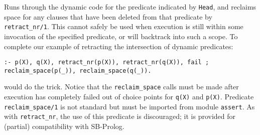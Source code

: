 \begin{description}
{%

 Runs
through the dynamic code for the predicate indicated by {\tt Head},
and reclaims space for any clauses that have been deleted from that
predicate by {\tt retract\_nr/1}.  This cannot safely be used when
execution is still within some invocation of the specified predicate,
or will backtrack into such a scope.  To complete our example of
retracting the intersection of dynamic predicates:
\begin{center}
{\tt :- p(X), q(X), retract\_nr(p(X)), retract\_nr(q(X)), fail\ ;\\
     reclaim\_space(p(\_)), reclaim\_space(q(\_)).}
\end{center}
would do the trick. Notice that the {\tt reclaim\_space} calls 
must be made after execution has completely failed
out of choice points for {\tt q(X)} and {\tt p(X)}.  Predicate 
{\tt reclaim\_space/1} is not
standard but must be imported from module {\tt assert}.
As with {\tt retract\_nr}, the use of this predicate is discouraged; 
it is provided for (partial) compatibility with SB-Prolog.
}
\end{description}
